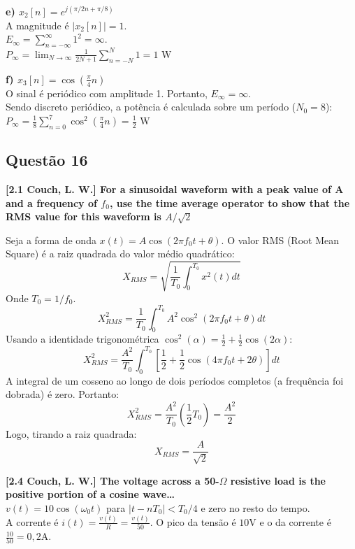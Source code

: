 \textbf{e) \(x_2[n] = e^{j(\pi/2 n + \pi/8)}\)}\\
A magnitude é \(|x_2[n]| = 1\).\\
\(E_\infty = \sum_{n=-\infty}^{\infty} 1^2 = \infty\).\\
\(P_\infty = \lim_{N \to \infty} \frac{1}{2N+1} \sum_{n=-N}^{N} 1 = 1 \text{ W}\)

\textbf{f) \(x_3[n] = \cos(\frac{\pi}{4} n)\)}\\
O sinal é periódico com amplitude 1. Portanto, \(E_\infty = \infty\).\\
Sendo discreto periódico, a potência é calculada sobre um período (\(N_0 = 8\)):\\
\(P_\infty = \frac{1}{8} \sum_{n=0}^{7} \cos^2(\frac{\pi}{4} n) = \frac{1}{2} \text{ W}\)

\subsection{Questão 16}\label{questuxe3o-16}

\textbf{{[}2.1 Couch, L. W.{]} For a sinusoidal waveform with a peak value of A and a frequency of \(f_0\), use the time average operator to show that the RMS value for this waveform is \(A/\sqrt{2}\)}

Seja a forma de onda \(x(t) = A \cos(2\pi f_0 t + \theta)\). O valor RMS (Root Mean Square) é a raiz quadrada do valor médio quadrático:
\[X_{RMS} = \sqrt{ \frac{1}{T_0} \int_{0}^{T_0} x^2(t) dt }\]
Onde \(T_0 = 1/f_0\).
\[X_{RMS}^2 = \frac{1}{T_0} \int_{0}^{T_0} A^2 \cos^2(2\pi f_0 t + \theta) dt\]
Usando a identidade trigonométrica \(\cos^2(\alpha) = \frac{1}{2} + \frac{1}{2}\cos(2\alpha)\):
\[X_{RMS}^2 = \frac{A^2}{T_0} \int_{0}^{T_0} \left[ \frac{1}{2} + \frac{1}{2}\cos(4\pi f_0 t + 2\theta) \right] dt\]
A integral de um cosseno ao longo de dois períodos completos (a frequência foi dobrada) é zero. Portanto:
\[X_{RMS}^2 = \frac{A^2}{T_0} \left( \frac{1}{2} T_0 \right) = \frac{A^2}{2}\]
Logo, tirando a raiz quadrada:
\[X_{RMS} = \frac{A}{\sqrt{2}}\]

\textbf{{[}2.4 Couch, L. W.{]} The voltage across a 50-\(\Omega\) resistive load is the positive portion of a cosine wave\ldots{}}\\
\(v(t) = 10\cos(\omega_0 t)\) para \(|t - nT_0| < T_0/4\) e zero no resto do tempo.\\
A corrente é \(i(t) = \frac{v(t)}{R} = \frac{v(t)}{50}\). O pico da tensão é \(10\text{V}\) e o da corrente é \(\frac{10}{50} = 0,2\text{A}\).

